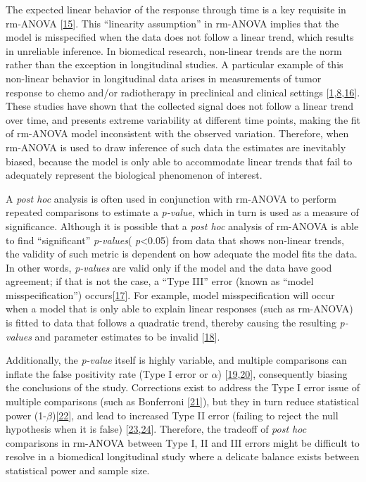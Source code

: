 \documentclass[
]{article}
\begin{document}
The expected linear behavior of the response through time is a key requisite in rm-ANOVA {[}\protect\hyperlink{ref-pinheiro2006}{15}{]}. This ``linearity assumption'' in rm-ANOVA implies that the model is misspecified when the data does not follow a linear trend, which results in unreliable inference. In biomedical research, non-linear trends are the norm rather than the exception in longitudinal studies. A particular example of this non-linear behavior in longitudinal data arises in measurements of tumor response to chemo and/or radiotherapy in preclinical and clinical settings {[}\protect\hyperlink{ref-roblyer2011}{1},\protect\hyperlink{ref-skala2010}{8},\protect\hyperlink{ref-vishwanath2009}{16}{]}. These studies have shown that the collected signal does not follow a linear trend over time, and presents extreme variability at different time points, making the fit of rm-ANOVA model inconsistent with the observed variation. Therefore, when rm-ANOVA is used to draw inference of such data the estimates are inevitably biased, because the model is only able to accommodate linear trends that fail to adequately represent the biological phenomenon of interest.

A \emph{post hoc} analysis is often used in conjunction with rm-ANOVA to perform repeated comparisons to estimate a \emph{p-value}, which in turn is used as a measure of significance.
Although it is possible that a \emph{post hoc} analysis of rm-ANOVA is able to find ``significant'' \emph{p-values}( \emph{p}\textless0.05) from data that shows non-linear trends, the validity of such metric is dependent on how adequate the model fits the data. In other words, \emph{p-values} are valid only if the model and the data have good agreement; if that is not the case, a ``Type III'' error (known as ``model misspecification'') occurs{[}\protect\hyperlink{ref-dennis2019}{17}{]}. For example, model misspecification will occur when a model that is only able to explain linear responses (such as rm-ANOVA) is fitted to data that follows a quadratic trend, thereby causing the resulting \emph{p-values} and parameter estimates to be invalid {[}\protect\hyperlink{ref-wang2019}{18}{]}.

Additionally, the \emph{p-value} itself is highly variable, and multiple comparisons can inflate the false positivity rate (Type I error or \(\alpha\)) {[}\protect\hyperlink{ref-liu2010}{19},\protect\hyperlink{ref-halsey2015}{20}{]}, consequently biasing the conclusions of the study. Corrections exist to address the Type I error issue of multiple comparisons (such as Bonferroni {[}\protect\hyperlink{ref-abdi2010}{21}{]}), but they in turn reduce statistical power (1-\(\beta\)){[}\protect\hyperlink{ref-nakagawa2004}{22}{]}, and lead to increased Type II error (failing to reject the null hypothesis when it is false) {[}\protect\hyperlink{ref-gelman2012}{23},\protect\hyperlink{ref-albers2019}{24}{]}. Therefore, the tradeoff of \emph{post hoc} comparisons in rm-ANOVA between Type I, II and III errors might be difficult to resolve in a biomedical longitudinal study where a delicate balance exists between statistical power and sample size.
\end{document}
